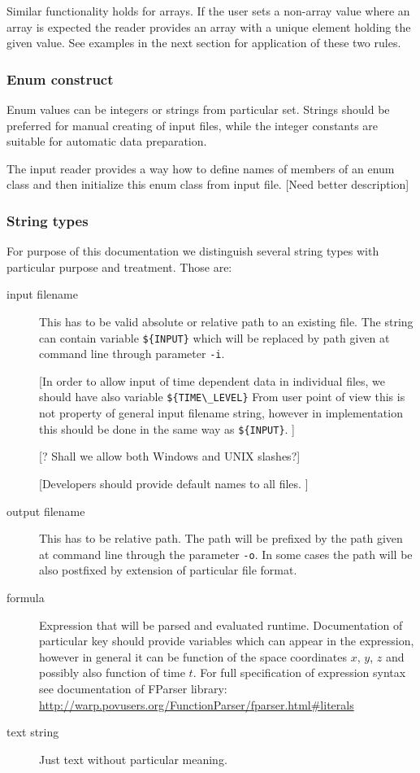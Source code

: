\documentclass[12pt,a4paper]{report}
\begin{document}
Similar functionality holds for arrays. If the user sets a non-array value where an array is expected the reader provides an array with a unique element holding the given value.
See examples in the next section for application of these two rules.



\subsubsection{Enum construct}
Enum values can be integers or strings from particular set. Strings should be preferred for manual creating of input files, while 
the integer constants are suitable for automatic data preparation. 

The input reader provides a way how to define names of members of an enum class and then 
initialize this enum class from input file.  [Need better description]

\subsubsection{String types}
For purpose of this documentation we distinguish several string types with particular purpose and treatment. Those are:
\begin{description}
\item[input filename] This has to be valid absolute or relative path to an existing file. 
The string can contain variable \verb'${INPUT}' %
which will be replaced by path given at command line through parameter \verb'-i'.

[In order to allow input of  time dependent data in individual files, we should 
 have also variable \verb'${TIME\_LEVEL}' %
 From user point of view this is not property of general input filename string, however
 in implementation this should be done in the same way as \verb'${INPUT}'.
]
 
[? Shall we allow both Windows and UNIX slashes?]

[Developers should provide default names to all files. ]

\item[output filename] This has to be relative path. The path will be prefixed by
the path given at command line through the parameter \verb'-o'.
In some cases the path will be also postfixed by extension of particular file format.

\item[formula] Expression that will be parsed and evaluated runtime. Documentation of particular key should provide 
variables which can appear in the expression, however in general it can be function of the space coordinates $x$, $y$, $z$ and possibly also 
function of time $t$. For full specification of expression syntax see documentation of FParser library:
\url{http://warp.povusers.org/FunctionParser/fparser.html\#literals}

\item[text string] Just text without particular meaning.
\end{description}
\end{document}
